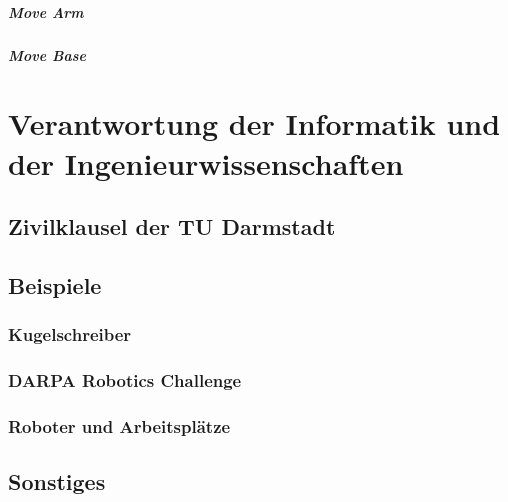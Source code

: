 \documentclass[a4paper, 11pt, accentcolor = tud3b]{tudreport}
\begin{document}
					\paragraph{Move Arm} %

					\paragraph{Move Base} %

	\chapter{Verantwortung der Informatik und der Ingenieurwissenschaften} %

		\section{Zivilklausel der TU Darmstadt} %

		\section{Beispiele} %

			\subsection{Kugelschreiber} %

			\subsection{DARPA Robotics Challenge} %

			\subsection{Roboter und Arbeitsplätze} %

		\section{Sonstiges} %
\end{document}
